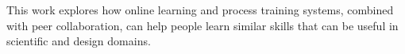 This work explores how online learning and process training systems, combined with
peer collaboration, can help people learn similar skills that
can be useful in scientific and design domains.











